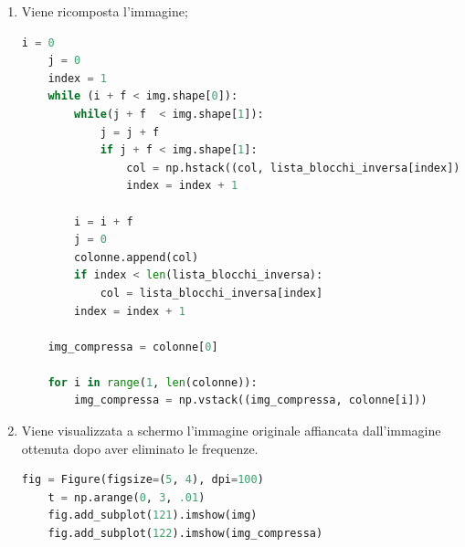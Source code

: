 \documentclass[preprint,12pt]{elsarticle}
\begin{document}
\begin{enumerate}
\item Viene ricomposta l'immagine;
\begin{lstlisting}[language=Python]
    i = 0
    j = 0
    index = 1
    while (i + f < img.shape[0]):
        while(j + f  < img.shape[1]):
            j = j + f
            if j + f < img.shape[1]:
                col = np.hstack((col, lista_blocchi_inversa[index]))
                index = index + 1

        i = i + f
        j = 0
        colonne.append(col)
        if index < len(lista_blocchi_inversa):
            col = lista_blocchi_inversa[index]
        index = index + 1

    img_compressa = colonne[0]

    for i in range(1, len(colonne)):
        img_compressa = np.vstack((img_compressa, colonne[i]))
\end{lstlisting}

\item Viene visualizzata a schermo l'immagine originale affiancata dall'immagine ottenuta dopo aver eliminato le frequenze.
\begin{lstlisting}[language=Python]    
    fig = Figure(figsize=(5, 4), dpi=100)
    t = np.arange(0, 3, .01)
    fig.add_subplot(121).imshow(img)
    fig.add_subplot(122).imshow(img_compressa)
\end{lstlisting}

\end{enumerate}
\end{document}
